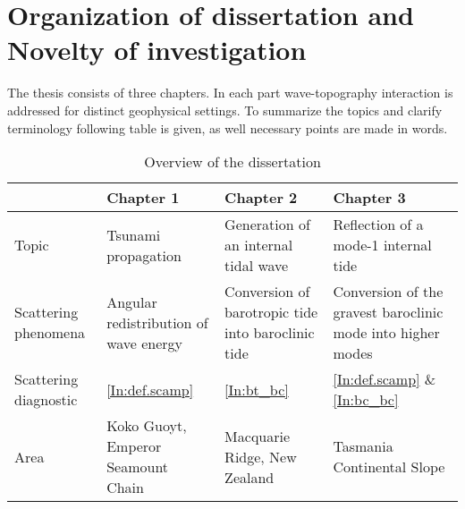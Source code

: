 \documentclass[12pt]{article}
\begin{document}
\section{Organization of dissertation and Novelty of investigation}
The thesis consists of three chapters. In each part wave-topography interaction is addressed for  
distinct geophysical settings. To summarize the topics and clarify terminology following table is 
given, as well necessary points are made in words.

\begin{table}
	\centering
	\begin{tabular}{ |M{3.5cm}|M{4.5cm}|M{4.5cm}|M{4.5cm}|  }
	\hline
	~ & Chapter 1 & Chapter 2 & Chapter 3\\
	\hline
	Topic & Tsunami propagation & Generation of an internal tidal wave & Reflection of a mode-1 
	internal tide\\
	\hline
	Scattering phenomena & Angular redistribution of wave energy & Conversion of barotropic tide 
	into baroclinic tide & Conversion of the gravest baroclinic mode into higher modes\\ 
	\hline
	Scattering diagnostic & \eqref{In:def.scamp} & \eqref{In:bt_bc} & \eqref{In:def.scamp} \& 
	\eqref{In:bc_bc}\\
	\hline
	Area & Koko Guoyt, Emperor Seamount Chain & Macquarie Ridge, New Zealand & Tasmania Continental 
	Slope\\
	\hline
	\end{tabular}\\
\caption{Overview of the dissertation}
\end{table}
	
\end{document}
